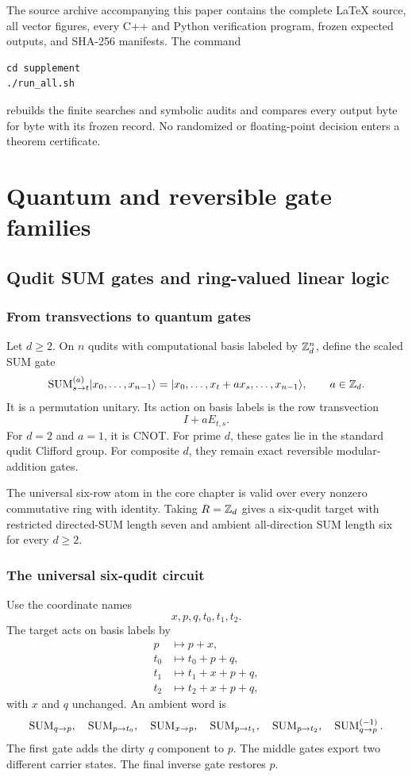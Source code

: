 The source archive accompanying this paper contains the complete LaTeX source, all vector figures, every C++ and Python verification program, frozen expected outputs, and SHA-256 manifests.  The command
\begin{verbatim}
cd supplement
./run_all.sh
\end{verbatim}
rebuilds the finite searches and symbolic audits and compares every output byte for byte with its frozen record.  No randomized or floating-point decision enters a theorem certificate.


\chapter{Quantum and reversible gate families}
\section{Qudit SUM gates and ring-valued linear logic}\label{g:ch:qudit-sum}


\subsection{From transvections to quantum gates}
Let $d\ge2$.  On $n$ qudits with computational basis labeled by $\mathbb Z_d^n$, define the scaled SUM gate
\[
\operatorname{SUM}^{(a)}_{s\to t}
\lvert x_0,\ldots,x_{n-1}\rangle
=
\lvert x_0,\ldots,x_t+a x_s,\ldots,x_{n-1}\rangle,
\qquad a\in\mathbb Z_d.
\]
It is a permutation unitary.  Its action on basis labels is the row transvection
\[
I+aE_{t,s}.
\]
For $d=2$ and $a=1$, it is CNOT.  For prime $d$, these gates lie in the standard qudit Clifford group.  For composite $d$, they remain exact reversible modular-addition gates.

\begin{provedbox}
The universal six-row atom in the core chapter is valid over every nonzero commutative ring with identity.  Taking $R=\mathbb Z_d$ gives a six-qudit target with restricted directed-SUM length seven and ambient all-direction SUM length six for every $d\ge2$.
\end{provedbox}

\subsection{The universal six-qudit circuit}
Use the coordinate names
\[
x,p,q,t_0,t_1,t_2.
\]
The target acts on basis labels by
\begin{align*}
p&\mapsto p+x,\\
t_0&\mapsto t_0+p+q,\\
t_1&\mapsto t_1+x+p+q,\\
t_2&\mapsto t_2+x+p+q,
\end{align*}
with $x$ and $q$ unchanged.  An ambient word is
\[
\operatorname{SUM}_{q\to p},
\quad
\operatorname{SUM}_{p\to t_0},
\quad
\operatorname{SUM}_{x\to p},
\quad
\operatorname{SUM}_{p\to t_1},
\quad
\operatorname{SUM}_{p\to t_2},
\quad
\operatorname{SUM}^{(-1)}_{q\to p}.
\]
The first gate adds the dirty $q$ component to $p$.  The middle gates export two different carrier states.  The final inverse gate restores $p$.


